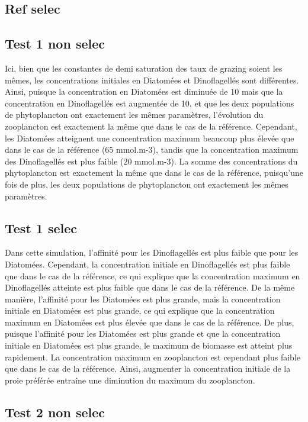 \subsection{Ref selec}


\subsection{Test 1 non selec}

Ici, bien que les constantes de demi saturation des taux de grazing soient les mêmes, les concentrations initiales en Diatomées et Dinoflagellés sont différentes. Ainsi, puisque la concentration en Diatomées est diminuée de 10 mais que la concentration en Dinoflagellés est augmentée de 10, et que les deux populations de phytoplancton ont exactement les mêmes paramètres, l'évolution du zooplancton est exactement la même que dans le cas de la référence. Cependant, les Diatomées atteignent une concentration maximum beaucoup plus élevée que dans le cas de la référence (65 mmol.m-3), tandis que la concentration maximum des Dinoflagellés est plus faible (20 mmol.m-3). La somme des concentrations du phytoplancton est exactement la même que dans le cas de la référence, puisqu'une fois de plus, les deux populations de phytoplancton ont exactement les mêmes paramètres.

\subsection{Test 1 selec}

Dans cette simulation, l'affinité pour les Dinoflagellés est plus faible que pour les Diatomées. Cependant, la concentration initiale en Dinoflagellés est plus faible que dans le cas de la référence, ce qui explique que la concentration maximum en Dinoflagellés atteinte est plus faible que dans le cas de la référence.
De la même manière, l'affinité pour les Diatomées est plus grande, mais la concentration initiale en Diatomées est plus grande, ce qui explique que la concentration maximum en Diatomées est plus élevée que dans le cas de la référence.
De plus, puisque l'affinité pour les Diatomées est plus grande et que la concentration initiale en Diatomées est plus grande, le maximum de biomasse est atteint plus rapidement. 
La concentration maximum en zooplancton est cependant plus faible que dans le cas de la référence. Ainsi, augmenter la concentration initiale de la proie préférée entraîne une diminution du maximum du zooplancton. 

\subsection{Test 2 non selec}

